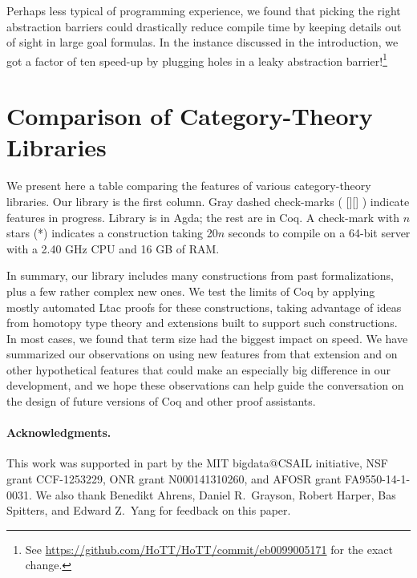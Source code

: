 \documentclass[runningheads]{llncs}
\makeatletter
\newlength{\assizeof@height}
\newlength{\assizeof@depth}
\newlength{\assizeof@width}
\newcommand{\asheightof}[2]{%
  \settoheight{\assizeof@height}{#2}%
  \settowidth{\assizeof@width}{#2}%
  \settodepth{\assizeof@depth}{#2}%
  \raisebox{0pt}[\assizeof@height][\assizeof@depth]{#1}%
}
\newcommand{\checkmarkdashed}{\asheightof{\usebox{\checkmarkdashed@box}}{\checkmark}}
\makeatother
\begin{document}
    Perhaps less typical of programming experience, we found that picking the right abstraction barriers could drastically reduce compile time by keeping details out of sight in large goal formulas.  In the instance discussed in the introduction, we got a factor of ten speed-up by plugging holes in a leaky abstraction barrier!\footnote{See \url{https://github.com/HoTT/HoTT/commit/eb0099005171} for the exact change.}


\section{Comparison of Category-Theory Libraries} \label{sec:compare-libraries}

\newcommand{\allstars}{**********}

We present here a table comparing the features of various category-theory libraries.  Our library is the first column.  Gray dashed check-marks (\checkmarkdashed) indicate features in progress.  Library \autocite{copumpkin/categories} is in Agda; the rest are in Coq.  A check-mark with $n$ stars (*) indicates a construction taking 20$n$ seconds to compile on a 64-bit server with a 2.40 GHz CPU and 16 GB of RAM.



\vspace*{\dimexpr-2.5\baselineskip\relax}

In summary, our library includes many constructions from past formalizations, plus a few rather complex new ones.  We test the limits of Coq by applying mostly automated Ltac proofs for these constructions, taking advantage of ideas from homotopy type theory and extensions built to support such constructions. In most cases, we found that term size had the biggest impact on speed. We have summarized our observations on using new features from that extension and on other hypothetical features that could make an especially big difference in our development, and we hope these observations can help guide the conversation on the design of future versions of Coq and other proof assistants.

\paragraph{Acknowledgments.} This work was supported in part by the MIT bigdata@CSAIL initiative, NSF grant CCF-1253229, ONR grant N000141310260, and AFOSR grant FA9550-14-1-0031.  We also thank Benedikt Ahrens, Daniel R.~Grayson, Robert Harper, Bas Spitters, and Edward Z.~Yang for feedback on this paper.



\clearpage

\printbibliography
\end{document}
